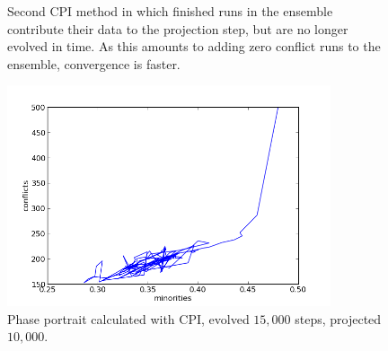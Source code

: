 \documentclass[11pt]{article}
\begin{document}
\begin{figure}
  \centering
  \hspace{3mm}
  \caption{Second CPI method in which finished runs in the ensemble contribute their data to the projection step, but are no longer evolved in time. As this amounts to adding zero conflict runs to the ensemble, convergence is faster.}
  \label{fig:vmFast}
\end{figure}

\begin{figure}
  \centering
  \includegraphics[height=65mm]{vmCPIPP}
  \caption{Phase portrait calculated with CPI, evolved $15,000$ steps, projected $10,000$.}
  \label{fig:vmPP}
\end{figure}
\end{document}
